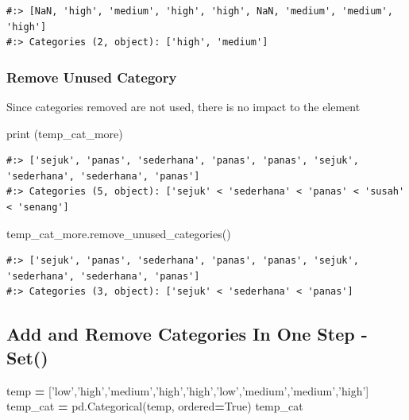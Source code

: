\documentclass[
]{book}
\newenvironment{Shaded}{\begin{snugshade}}{\end{snugshade}}
\newcommand{\BuiltInTok}[1]{#1}
\newcommand{\NormalTok}[1]{#1}
\newcommand{\OperatorTok}[1]{\textcolor[rgb]{0.43,0.43,0.43}{\textbf{#1}}}
\newcommand{\StringTok}[1]{\textcolor[rgb]{0.5,0.5,0.5}{#1}}
\newcommand{\VariableTok}[1]{\textcolor[rgb]{0,0,0}{#1}}
\begin{document}
\begin{verbatim}
#:> [NaN, 'high', 'medium', 'high', 'high', NaN, 'medium', 'medium', 'high']
#:> Categories (2, object): ['high', 'medium']
\end{verbatim}

\hypertarget{remove-unused-category}{%
\subsubsection{Remove Unused Category}\label{remove-unused-category}}

Since categories removed are not used, there is no impact to the element

\begin{Shaded}
\begin{Highlighting}[]
\BuiltInTok{print}\NormalTok{ (temp_cat_more)}
\end{Highlighting}
\end{Shaded}

\begin{verbatim}
#:> ['sejuk', 'panas', 'sederhana', 'panas', 'panas', 'sejuk', 'sederhana', 'sederhana', 'panas']
#:> Categories (5, object): ['sejuk' < 'sederhana' < 'panas' < 'susah' < 'senang']
\end{verbatim}

\begin{Shaded}
\begin{Highlighting}[]
\NormalTok{temp_cat_more.remove_unused_categories()}
\end{Highlighting}
\end{Shaded}

\begin{verbatim}
#:> ['sejuk', 'panas', 'sederhana', 'panas', 'panas', 'sejuk', 'sederhana', 'sederhana', 'panas']
#:> Categories (3, object): ['sejuk' < 'sederhana' < 'panas']
\end{verbatim}

\hypertarget{add-and-remove-categories-in-one-step---set}{%
\subsection{Add and Remove Categories In One Step - Set()}\label{add-and-remove-categories-in-one-step---set}}

\begin{Shaded}
\begin{Highlighting}[]
\NormalTok{temp }\OperatorTok{=}\NormalTok{ [}\StringTok{'low'}\NormalTok{,}\StringTok{'high'}\NormalTok{,}\StringTok{'medium'}\NormalTok{,}\StringTok{'high'}\NormalTok{,}\StringTok{'high'}\NormalTok{,}\StringTok{'low'}\NormalTok{,}\StringTok{'medium'}\NormalTok{,}\StringTok{'medium'}\NormalTok{,}\StringTok{'high'}\NormalTok{]}
\NormalTok{temp_cat }\OperatorTok{=}\NormalTok{ pd.Categorical(temp, ordered}\OperatorTok{=}\VariableTok{True}\NormalTok{)}
\NormalTok{temp_cat}
\end{Highlighting}
\end{Shaded}
\end{document}
